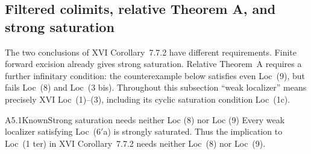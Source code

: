 \subsection{Filtered colimits, relative Theorem A, and strong saturation}
\label{sec:A5}

The two conclusions of XVI Corollary~7.7.2 have different requirements.
Finite forward excision already gives strong saturation.  Relative
Theorem~A requires a further infinitary condition: the counterexample below
satisfies even Loc~(9), but fails Loc~(8) and Loc~(3 bis).
Throughout this subsection ``weak localizer'' means precisely XVI
Loc~(1)--(3), including its cyclic saturation condition Loc~(1c).

\begin{claim}{A5.1}{Known}{Strong saturation needs neither Loc (8) nor Loc (9)}
\label{A51}
Every weak localizer satisfying Loc~($6'$a) is strongly saturated.
Thus the implication to Loc~(1 ter) in XVI Corollary~7.7.2 needs neither
Loc~(8) nor Loc~(9).
\end{claim}
